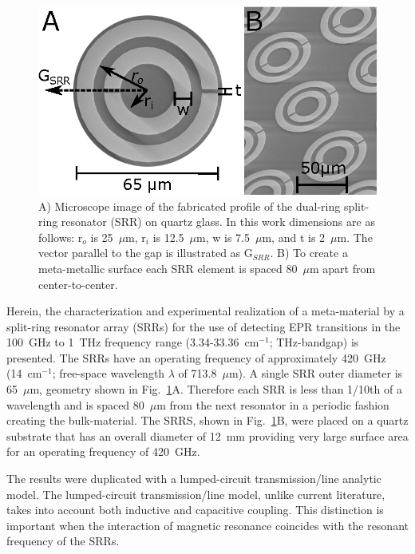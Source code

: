 \begin{figure}[htpb]
\centering
  \includegraphics{Kapitel/Ch3-Images/01-Measurements.eps}%
  \caption[Microscope image of the SRR geometry.]{ A) Microscope image of the fabricated profile of the dual-ring split-ring resonator (SRR) on quartz glass. In this work dimensions are as follows: r$_o$ is 25~$\mu$m, r$_i$ is 12.5~$\mu$m, w is 7.5~$\mu$m, and t is 2~$\mu$m. The vector parallel to the gap is illustrated as G$_{SRR}$. B) To create a meta-metallic surface each SRR element is spaced 80~$\mu$m apart from center-to-center.}
  \label{ch3-fig:sizes}
\end{figure}

Herein, the characterization and experimental realization of a meta-material by a split-ring resonator array (SRRs) for the use of detecting EPR transitions in the 100~GHz to 1~THz frequency range (3.34-33.36~cm$^{-1}$; THz-bandgap) is presented. The SRRs have an operating frequency of approximately 420~GHz (14~cm$^{-1}$; free-space wavelength $\lambda$ of 713.8~$\mu$m). A single SRR outer diameter is 65~$\mu$m, geometry shown in Fig.~\ref{ch3-fig:sizes}A. Therefore each SRR is less than 1/10th of a wavelength and is spaced 80~$\mu$m from the next resonator in a periodic fashion creating the bulk-material. The SRRS, shown in Fig.~\ref{ch3-fig:sizes}B, were placed on a quartz substrate that has an overall diameter of 12~mm providing very large surface area for an operating frequency of 420~GHz.

The results were duplicated with a lumped-circuit transmission\-/line analytic model. The lumped-circuit transmission\-/line model, unlike current literature, takes into account both inductive and capacitive coupling. This distinction is important when the interaction of magnetic resonance coincides with the resonant frequency of the SRRs.

